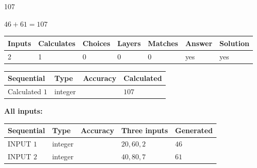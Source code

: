 \documentclass[12pt]{article}
\begin{document}
\noindent{}
 
 

107
 
 
\noindent{}
 
 

 
 
 
\noindent{}
 
 

$ %
46 +  %
61=   %
107$
 
 
\noindent{}
 
 

 
   
   
   
   
\noindent\begin{tabular}{|l|l|l|l|l|l|l|}
 \hline
Inputs & Calculates & Choices & Layers & Matches & Answer & Solution \\ \hline
 2  & 
 1  & 
 0
  & 
 0  & 
 0  & 
  yes & 
  yes 
  \\ \hline
 \end{tabular}
   
   
   
   
\noindent{}
   
   
  
  
\noindent\begin{tabular}{|l|l|l|l|}
\hline
 Sequential & Type & Accuracy & Calculated \\ 
\hline
 
 
  Calculated $  1 $ & integer &  & 
  $ 107 $ 
 \\  \hline  
 \end{tabular}
   
   
   
   
\noindent\vspace{0.1in}\hspace{-0.08in} {\textbf{\Large{All inputs: }}}
   
   
  
  
\noindent\begin{tabular}{|l|l|l|l|l|}
\hline
 Sequential & Type & Accuracy & Three inputs & Generated \\ 
\hline
 
 
  INPUT $  1 $ & integer &  & $
 20
 , 
 60
 , 
 2
 $ & $ 46 $ 
 \\  \hline  
 
 
  INPUT $  2 $ & integer &  & $
 40
 , 
 80
 , 
 7
 $ & $ 61 $ 
 \\  \hline  
 \end{tabular}
   
\end{document}
